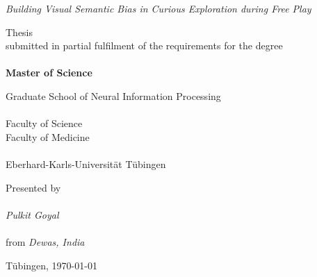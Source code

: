 \begin{titlepage}
    \begin{center}
        \vspace*{1cm}

        {\Large \textit{Building Visual Semantic Bias in Curious Exploration during Free Play}}

        \vspace{86pt}

        Thesis\\
        submitted in partial fulfilment of the requirements for the degree\\~\\
        {\textbf{Master of Science}}

        \vspace{76pt}

        Graduate School of Neural Information Processing\\~\\
        Faculty of Science\\
        Faculty of Medicine\\~\\
        Eberhard-Karls-Universität Tübingen

        \vspace{66pt}

        Presented by\\~\\
        \textit{Pulkit Goyal}\\~\\
        from \textit{Dewas, India}

        \vspace{56pt}

        Tübingen, \today
    \end{center}
\end{titlepage}